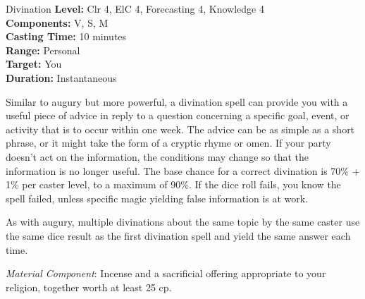{Divination}
{
	\textbf{Level:}
	Clr 4, ElC 4, Forecasting 4, Knowledge 4\\
	\textbf{Components:}
	V, S, M\\
	\textbf{Casting Time:}
	10 minutes\\
	\textbf{Range:}
	Personal\\
	\textbf{Target:}
	You\\
	\textbf{Duration:}
	Instantaneous\\
}
{
	Similar to augury but more powerful, a divination spell can provide you with a useful piece of advice in reply to a question concerning a specific goal, event, or activity that is to occur within one week. The advice can be as simple as a short phrase, or it might take the form of a cryptic rhyme or omen. If your party doesn't act on the information, the conditions may change so that the information is no longer useful. The base chance for a correct divination is 70\% + 1\% per caster level, to a maximum of 90\%. If the dice roll fails, you know the spell failed, unless specific magic yielding false information is at work.

	As with augury, multiple divinations about the same topic by the same caster use the same dice result as the first divination spell and yield the same answer each time.

	\textit{Material Component}:
	Incense and a sacrificial offering appropriate to your religion, together worth at least 25 cp.

}
